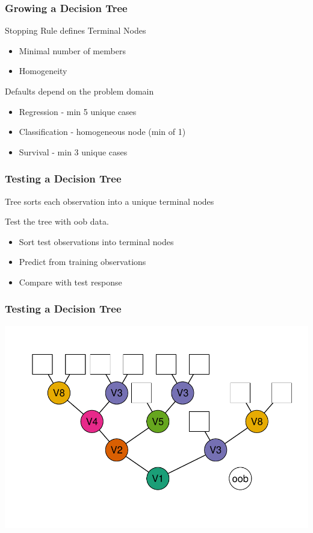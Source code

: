 \documentclass[xcolor=svgnames]{beamer}\usepackage[]{graphicx}\usepackage[]{color}
\newenvironment{knitrout}{}{} %
\begin{document}
\begin{frame}
\frametitle{Growing a Decision Tree}
Stopping Rule defines Terminal Nodes
\begin{itemize}
\item Minimal number of members
\item Homogeneity
\end{itemize}

Defaults depend on the problem domain

\begin{itemize}
\item Regression - min 5 unique cases
\item Classification - homogeneous node (min of 1)
\item Survival - min 3 unique cases
\end{itemize}

\end{frame}
\begin{frame}
\frametitle{Testing a Decision Tree}

Tree sorts each observation into a unique terminal nodes

Test the tree with oob data.
\begin{itemize}
\item Sort test observations into terminal nodes
  \item Predict from training observations
  \item Compare with test response
\end{itemize}

\end{frame}
\begin{frame}
\frametitle{Testing a Decision Tree}

\begin{knitrout}\footnotesize
{}\color{fgcolor}

{\centering \includegraphics[width=.9\linewidth]{figures/decisionTree-1} 

}



\end{knitrout}

\end{frame}
\end{document}
